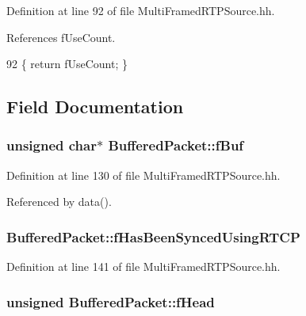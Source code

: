 Definition at line 92 of file Multi\+Framed\+R\+T\+P\+Source.\+hh.



References f\+Use\+Count.


\begin{DoxyCode}
92 \{ \textcolor{keywordflow}{return} fUseCount; \}
\end{DoxyCode}


\subsection{Field Documentation}
\subsubsection[{f\+Buf}]{\setlength{\rightskip}{0pt plus 5cm}unsigned char$\ast$ Buffered\+Packet\+::f\+Buf\hspace{0.3cm}{\ttfamily [protected]}}\label{classBufferedPacket_a0313009b149f8d0ad4de988b98ba3781}


Definition at line 130 of file Multi\+Framed\+R\+T\+P\+Source.\+hh.



Referenced by data().

\subsubsection[{f\+Has\+Been\+Synced\+Using\+R\+T\+C\+P}]{ Buffered\+Packet\+::f\+Has\+Been\+Synced\+Using\+R\+T\+C\+P\hspace{0.3cm}{\ttfamily [private]}}\label{classBufferedPacket_a9b8f6e802cadcf67972640cf67113548}


Definition at line 141 of file Multi\+Framed\+R\+T\+P\+Source.\+hh.

\subsubsection[{f\+Head}]{\setlength{\rightskip}{0pt plus 5cm}unsigned Buffered\+Packet\+::f\+Head\hspace{0.3cm}{\ttfamily [protected]}}\label{classBufferedPacket_afe193b20a82b39ed7dc0a1b9f204bff7}


